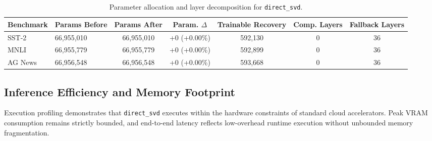 \begin{table}[t]
\centering
\small
\begin{tabular}{llccccc}
\toprule
\textbf{Benchmark} & \textbf{Params Before} & \textbf{Params After} & \textbf{Param. $\Delta$} & \textbf{Trainable Recovery} & \textbf{Comp. Layers} & \textbf{Fallback Layers} \\
\midrule
SST-2 & 66,955,010 & 66,955,010 & +0 (+0.00\%) & 592,130 & 0 & 36 \\
MNLI & 66,955,779 & 66,955,779 & +0 (+0.00\%) & 592,899 & 0 & 36 \\
AG News & 66,956,548 & 66,956,548 & +0 (+0.00\%) & 593,668 & 0 & 36 \\
\bottomrule
\end{tabular}
\caption{Parameter allocation and layer decomposition for \texttt{direct\_svd}.}
\label{tab:params\_direct\_svd}
\end{table}

\subsection{Inference Efficiency and Memory Footprint}
Execution profiling demonstrates that \texttt{direct\_svd} executes within the hardware constraints of standard cloud accelerators. Peak VRAM consumption remains strictly bounded, and end-to-end latency reflects low-overhead runtime execution without unbounded memory fragmentation.

